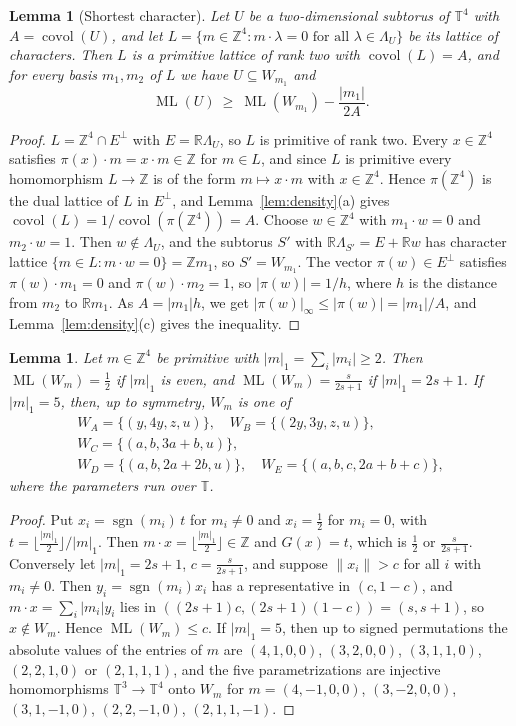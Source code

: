 \documentclass[12pt]{amsart}
\newtheorem{lemma}[theorem]{Lemma}
\theoremstyle{definition}\newtheorem{definition}[theorem]{Definition}
\theoremstyle{remark}\newtheorem{remark}[theorem]{Remark}
\newcommand{\Z}{\mathbb Z}\newcommand{\R}{\mathbb R}\newcommand{\T}{\mathbb T}
\newcommand{\norm}[1]{\lVert #1\rVert}
\newcommand{\ML}{\operatorname{ML}}
\newcommand{\covol}{\operatorname{covol}}
\newcommand{\supn}[1]{\lvert #1\rvert_\infty}
\newcommand{\eucl}[1]{\lvert #1\rvert}
\begin{document}
\begin{lemma}[Shortest character]\label{lem:shortchar}
Let $U$ be a two-dimensional subtorus of $\T^4$ with $A=\covol(U)$, and let $L=\{m\in\Z^4:m\cdot\lambda=0\text{ for all }\lambda\in\Lambda_U\}$ be its lattice of characters. Then $L$ is a primitive lattice of rank two with $\covol(L)=A$, and for every basis $m_1,m_2$ of $L$ we have $U\subseteq W_{m_1}$ and
\[
 \ML(U)\ \ge\ \ML(W_{m_1})-\frac{\eucl{m_1}}{2A}.
\]
\end{lemma}
\begin{proof}
$L=\Z^4\cap E^\perp$ with $E=\R\Lambda_U$, so $L$ is primitive of rank two. Every $x\in\Z^4$ satisfies $\pi(x)\cdot m=x\cdot m\in\Z$ for $m\in L$, and since $L$ is primitive every homomorphism $L\to\Z$ is of the form $m\mapsto x\cdot m$ with $x\in\Z^4$. Hence $\pi(\Z^4)$ is the dual lattice of $L$ in $E^\perp$, and Lemma~\ref{lem:density}(a) gives $\covol(L)=1/\covol(\pi(\Z^4))=A$. Choose $w\in\Z^4$ with $m_1\cdot w=0$ and $m_2\cdot w=1$. Then $w\notin\Lambda_U$, and the subtorus $S'$ with $\R\Lambda_{S'}=E+\R w$ has character lattice $\{m\in L:m\cdot w=0\}=\Z m_1$, so $S'=W_{m_1}$. The vector $\pi(w)\in E^\perp$ satisfies $\pi(w)\cdot m_1=0$ and $\pi(w)\cdot m_2=1$, so $\eucl{\pi(w)}=1/h$, where $h$ is the distance from $m_2$ to $\R m_1$. As $A=\eucl{m_1}h$, we get $\supn{\pi(w)}\le\eucl{\pi(w)}=\eucl{m_1}/A$, and Lemma~\ref{lem:density}(c) gives the inequality.
\end{proof}

\begin{lemma}\label{lem:Wodd}
Let $m\in\Z^4$ be primitive with $|m|_1=\sum_i|m_i|\ge2$. Then $\ML(W_m)=\frac12$ if $|m|_1$ is even, and $\ML(W_m)=\frac s{2s+1}$ if $|m|_1=2s+1$. If $|m|_1=5$, then, up to symmetry, $W_m$ is one of
\begin{gather*}
 W_A=\{(y,4y,z,u)\},\quad W_B=\{(2y,3y,z,u)\},\\ W_C=\{(a,b,3a+b,u)\},\\
 W_D=\{(a,b,2a+2b,u)\},\quad W_E=\{(a,b,c,2a+b+c)\},
\end{gather*}
where the parameters run over $\T$.
\end{lemma}
\begin{proof}
Put $x_i=\operatorname{sgn}(m_i)\,t$ for $m_i\ne0$ and $x_i=\frac12$ for $m_i=0$, with $t=\lfloor\frac{|m|_1}2\rfloor/|m|_1$. Then $m\cdot x=\lfloor\frac{|m|_1}2\rfloor\in\Z$ and $G(x)=t$, which is $\frac12$ or $\frac s{2s+1}$. Conversely let $|m|_1=2s+1$, $c=\frac s{2s+1}$, and suppose $\norm{x_i}>c$ for all $i$ with $m_i\ne0$. Then $y_i=\operatorname{sgn}(m_i)x_i$ has a representative in $(c,1-c)$, and $m\cdot x=\sum_i|m_i|y_i$ lies in $((2s+1)c,(2s+1)(1-c))=(s,s+1)$, so $x\notin W_m$. Hence $\ML(W_m)\le c$. If $|m|_1=5$, then up to signed permutations the absolute values of the entries of $m$ are $(4,1,0,0)$, $(3,2,0,0)$, $(3,1,1,0)$, $(2,2,1,0)$ or $(2,1,1,1)$, and the five parametrizations are injective homomorphisms $\T^3\to\T^4$ onto $W_m$ for $m=(4,-1,0,0)$, $(3,-2,0,0)$, $(3,1,-1,0)$, $(2,2,-1,0)$, $(2,1,1,-1)$.
\end{proof}
\end{document}
